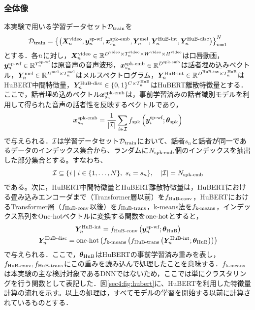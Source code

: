 \subsubsection{全体像}
本実験で用いる学習データセット$\mathcal{D}_{\text{train}}$を
\begin{equation}
    \mathcal{D}_{\text{train}} = \left\{\left(\bm{X}^{\text{video}}_{n}, \bm{y}^{\text{sp-wf}}_{n}, \bm{x}^{\text{spk-emb}}_{s_{n}}, \bm{Y}^{\text{mel}}_{n}, \bm{Y}^{\text{HuB-int}}_{n}, \bm{Y}^{\text{HuB-disc}}_{n}\right)\right\}_{n = 1}^{N}
\end{equation}
とする．各$n$に対し，$\bm{X}^{\text{video}}_{n} \in \mathbb{R}^{D^{\text{video}} \times T^{\text{video}}_{n} \times W^{\text{video}} \times H^{\text{video}}}$は口唇動画， $\bm{y}^{\text{sp-wf}}_{n} \in \mathbb{R}^{T^{\text{sp-wf}}_{n}}$は原音声の音声波形，$\bm{x}^{\text{spk-emb}}_{s_{n}} \in \mathbb{R}^{D^{\text{spk-emb}}}$は話者埋め込みベクトル，$\bm{Y}^{\text{mel}}_{n} \in \mathbb{R}^{D^{\text{mel}} \times T^{\text{mel}}_{n}}$はメルスペクトログラム，$\bm{Y}^{\text{HuB-int}}_{n} \in \mathbb{R}^{D^{\text{HuB-int}} \times T^{\text{HuB}}_{n}}$はHuBERT中間特徴量，$\bm{Y}^{\text{HuB-disc}}_{n} \in \{0, 1\}^{C \times T^{\text{HuB}}_{n}}$はHuBERT離散特徴量とする．ここで，話者埋め込めベクトル$\bm{x}^{\text{spk-emb}}_{s_{n}}$は，事前学習済みの話者識別モデル\cite{wan2018generalized}を利用して得られた音声の話者性を反映するベクトルであり，
\begin{equation}
    \bm{x}^{\text{spk-emb}}_{s_{n}} = \frac{1}{|\mathcal{I}|} \sum_{i \in \mathcal{I}} f_{\text{spk}}\left(\bm{y}^{\text{sp-wf}}_{i}; \bm{\theta}_{\text{spk}}\right)
\end{equation}
で与えられる．$\mathcal{I}$は学習データセット$\mathcal{D}_{\text{train}}$において、話者$s_{n}$と話者が同一であるデータのインデックス集合から、ランダムに$N_{\text{spk-emb}}$個のインデックスを抽出した部分集合とする。すなわち、
\begin{equation}
    \mathcal{I} \subseteq \{i \mid i \in \{1, \ldots, N\}, ~ s_{i} = s_{n}\}, \quad |\mathcal{I}| = N_{\text{spk-emb}}
\end{equation}
である。次に，HuBERT中間特徴量とHuBERT離散特徴量は，HuBERTにおける畳み込みエンコーダまで（Transformer層以前）を$f_{\text{HuB-conv}}$，HuBERTにおけるTransformer層（$f_{\text{HuB-conv}}$以後）を$f_{\text{HuB-trans}}$，k-means法を$f_{\text{k-means}}$，インデックス系列をOne-hotベクトルに変換する関数を$\text{one-hot}$とすると，
\begin{gather}
    \bm{Y}^{\text{HuB-int}}_{n} = f_{\text{HuB-conv}}\left(\bm{y}^{\text{sp-wf}}_{n}; \bm{\theta}_{\text{HuB}}\right) \\
    \bm{Y}^{\text{HuB-disc}}_{n} = \text{one-hot}\left(f_{\text{k-means}}\left(f_{\text{HuB-trans}}\left(\bm{Y}^{\text{HuB-int}}_{n}; \bm{\theta}_{\text{HuB}}\right)\right)\right)
\end{gather}
で与えられる．ここで，$\bm{\theta}_{\text{HuB}}$はHuBERTの事前学習済み重みを表し，$f_{\text{HuB-conv}}, f_{\text{HuB-trans}}$にこの重みを読み込んで処理したことを意味する．$f_{\text{k-means}}$は本実験の主な検討対象であるDNNではないため，ここでは単にクラスタリングを行う関数として表記した．図\ref{sec4:fig:hubert}に、HuBERTを利用した特徴量計算の流れを示す。以上の処理は，すべてモデルの学習を開始する以前に計算されているものとする．

